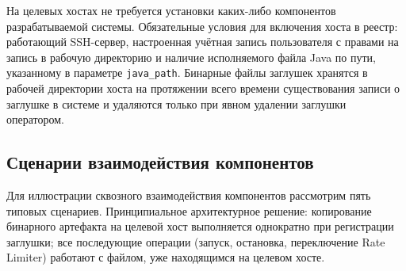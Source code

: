 







На целевых хостах не требуется установки каких-либо компонентов разрабатываемой системы. Обязательные условия для включения хоста в реестр: работающий SSH-сервер, настроенная учётная запись пользователя с правами на запись в рабочую директорию и наличие исполняемого файла Java по пути, указанному в параметре \texttt{java\_path}. Бинарные файлы заглушек хранятся в рабочей директории хоста на протяжении всего времени существования записи о заглушке в системе и удаляются только при явном удалении заглушки оператором.

\subsection{Сценарии взаимодействия компонентов}

Для иллюстрации сквозного взаимодействия компонентов рассмотрим пять типовых сценариев. Принципиальное архитектурное решение: копирование бинарного артефакта на целевой хост выполняется однократно при регистрации заглушки; все последующие операции (запуск, остановка, переключение Rate Limiter) работают с файлом, уже находящимся на целевом хосте.


